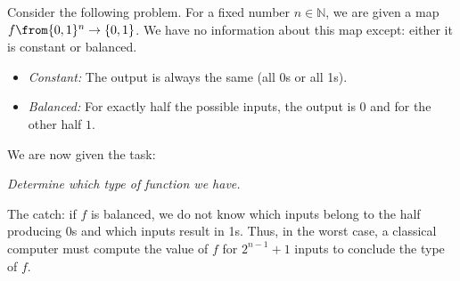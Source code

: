 \documentclass[a4paper,oneside, 12pt]{amsart}
\begin{document}
Consider the following problem.
For a fixed number \(n \in \mathbb{N}\), we are given a map \(f \from \{0,1\}^{n}\to\{0,1\}\).
We have no information about this map except: either it is constant or balanced.
\begin{itemize}
  \item \emph{Constant:} The output is always the same (all 0s or all 1s).
  \item \emph{Balanced:} For exactly half the possible inputs, the output is \(0\) and for the other half \(1\).
\end{itemize}
We are now given the task:
\medskip

\begin{center}
  \textit{Determine which type of function we have.}
\end{center}
\medskip

\noindent
The catch: if \(f\) is balanced, we do not know which inputs belong to the half producing 0s and which inputs result in 1s.
Thus, in the worst case, a classical computer must compute the value of \(f\) for \(2^{n-1} + 1\) inputs to conclude the type of \(f\).
\end{document}
